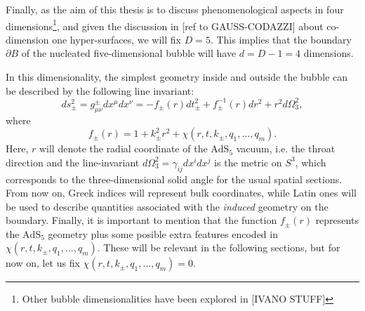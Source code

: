 \documentclass[12pt, a4paper]{article} %
\begin{document}
Finally, as the aim of this thesis is to discuss phenomenological aspects in four dimensions\footnote{Other bubble dimensionalities have been explored in [IVANO STUFF]}, and given the discussion in [ref to GAUSS-CODAZZI] about co-dimension one hyper-surfaces, we will fix $D=5$. This implies that the boundary $\partial B$ of the nucleated five-dimensional bubble will have $d = D-1 = 4$ dimensions.

In this dimensionality, the simplest geometry inside and outside the bubble can be described by the following line invariant:
\begin{equation}\label{eq: basic_global_bubble}
	ds_{\pm}^{2} = g^{\pm}_{\mu\nu} dx^{\mu} dx^{\nu} =  -f_{\pm}(r) dt_{\pm}^{2} + f^{-1}_{\pm}(r) dr^{2} + r^{2} d\Omega_{3}^{2},
\end{equation}
where
\begin{equation}\label{eq: vacuum_func}
	f_{\pm}(r) = 1 + k_{\pm}^{2} r^{2} + \chi(r, t, k_{\pm}, q_{1},..., q_{m}).
\end{equation}
Here, $r$ will denote the radial coordinate of the $\text{AdS}_{5}$ vacuum, i.e. the throat direction and the line-invariant $d\Omega_{3}^{2} = \gamma_{ij}dx^{i}dx^{j}$ is the metric on $S^{3}$, which corresponds to the three-dimensional solid angle for the usual spatial sections. From now on, Greek indices will represent bulk coordinates, while Latin ones will be used to describe quantities associated with the \textit{induced} geometry on the boundary. Finally, it is important to mention that the function $f_{\pm}(r)$ represents the $\text{AdS}_{5}$ geometry plus some posible extra features encoded in $\chi(r, t, k_{\pm}, q_{1},..., q_{m})$. These will be relevant in the following sections, but for now on, let us fix $\chi(r, t, k_{\pm}, q_{1},..., q_{m}) =0$.
\end{document}
